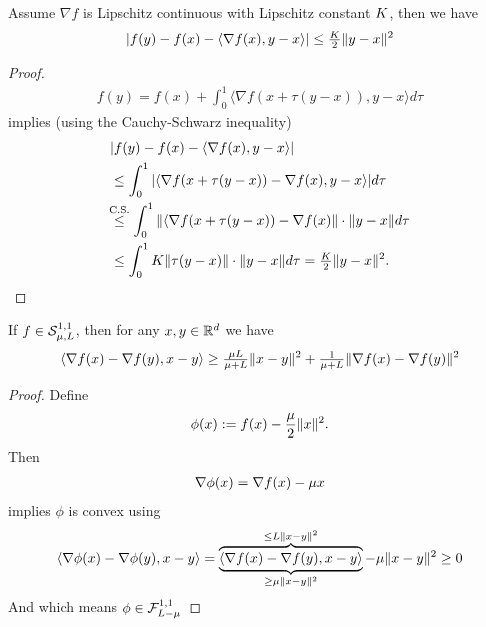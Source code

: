 \begin{lemma}
	\label{Appdx-lem: Lipschitz Gradient implies taylor inequality}
	Assume \(\nabla f\) is Lipschitz continuous with Lipschitz constant \(K\),
	then we have
	\begin{align*}
		|f(y) - f(x) - \langle \nabla f(x), y-x\rangle | \le \tfrac{K}2 \|y-x\|^2
	\end{align*}
\end{lemma}
\begin{proof}
	\begin{align*}
		f(y) = f(x) + \int_0^1\langle\nabla f(x+\tau(y-x)), y-x \rangle d\tau
	\end{align*}
	implies (using the  Cauchy-Schwarz inequality)
	\begin{align*}
		&| f(y) - f(x) - \langle \nabla f(x), y-x\rangle | \\
		&\le \int_0^1 | \langle\nabla f(x+\tau(y-x))-\nabla f(x), y-x\rangle | d\tau \\
		&\lxle{\text{C.S.}}
		\int_0^1 \|\langle\nabla f(x+\tau(y-x))-\nabla f(x)\| \cdot \|y-x\| d\tau\\
		&\le \int_0^1 \lipConst \|\tau(y-x)\|\cdot\|y-x\| d\tau
		= \tfrac{\lipConst}2 \|y-x\|^2.
		\qedhere
	\end{align*}
\end{proof}

\begin{theorem}
	\label{appdx-thm: technical strong convexity convergence proof component}
	If \(f\in\mathcal{S}^{1,1}_{{\mu},{L}}\), then for any
	\(x,y\in\mathbb{R}^d\) we have
	\begin{align*}
		\langle \nabla f(x) - \nabla f(y), x-y\rangle 
		\ge \tfrac{\mu L}{\mu+L} \| x-y\|^2
		+ \tfrac{1}{\mu+L}\|\nabla f(x) -\nabla f(y)\|^2
	\end{align*}
\end{theorem}
\begin{proof}
	Define 
	\begin{align*}
		\phi(x) := f(x) - \frac{\mu}{2}\|x\|^2.
	\end{align*}
	Then
	\begin{align*}
		\nabla \phi(x) = \nabla f(x) - \mu x
	\end{align*}
	implies \(\phi\) is convex using 
	\begin{align*}
		\langle \nabla \phi(x) - \nabla\phi(y), x-y\rangle
		= \overbrace{
			\underbrace{\langle \nabla f(x) - \nabla f(y), x-y\rangle}_{
				\ge \mu \|x-y\|^2
			}
		}^{
			\le L \|x-y\|^2
		} - \mu \|x-y\|^2 \ge 0
	\end{align*}
	And 
	which means \(\phi\in\mathcal{F}^{1,1}_{L-\mu}\)
\end{proof}


\endinput